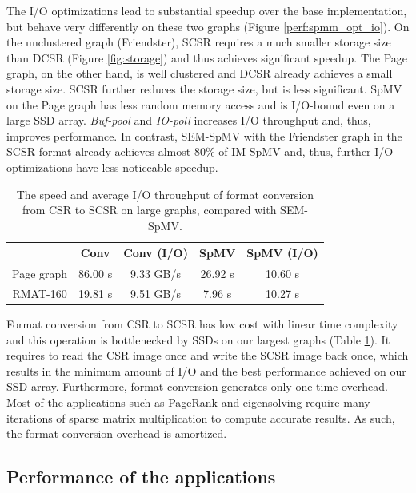 The I/O optimizations lead to substantial speedup over the base implementation,
but behave very differently on these two graphs (Figure \ref{perf:spmm_opt_io}).
On the unclustered graph (Friendster), SCSR requires a much smaller storage size
than DCSR (Figure \ref{fig:storage}) and thus achieves significant
speedup. The Page graph, on the other hand, is well clustered and DCSR already
achieves a small storage size. SCSR further reduces the storage size, but is
less significant. SpMV on the Page graph has less random memory access and is
I/O-bound even on a large SSD array. \textit{Buf-pool} and \textit{IO-poll}
increases I/O throughput and, thus, improves performance. In contrast, SEM-SpMV
with the Friendster graph in the SCSR format already achieves almost 80\% of
IM-SpMV and, thus, further I/O optimizations have less noticeable speedup.

\begin{table}
\begin{center}
\footnotesize
\begin{tabular}{|c|c|c|c|c|}
\hline
	& Conv & Conv (I/O) & SpMV & SpMV (I/O) \\
\hline
Page graph & 86.00 s & 9.33 GB/s & 26.92 s & 10.60 s\\
\hline
RMAT-160 & 19.81 s & 9.51 GB/s & 7.96 s & 10.27 s\\
\hline
\end{tabular}
\normalsize
\end{center}
\caption{The speed and average I/O throughput of format conversion from CSR
	to SCSR on large graphs, compared with SEM-SpMV.}
\label{convert}
\end{table}

Format conversion from CSR to SCSR has low cost with linear time complexity and
this operation is bottlenecked by SSDs on our largest graphs (Table \ref{convert}).
It requires to read
the CSR image once and write the SCSR image back once, which results in
the minimum amount of I/O and the best performance achieved on our SSD array.
Furthermore, format conversion generates only one-time overhead. Most of the applications
such as PageRank and eigensolving require many iterations of sparse matrix
multiplication to compute accurate results. As such, the format conversion
overhead is amortized.

\subsection{Performance of the applications}

